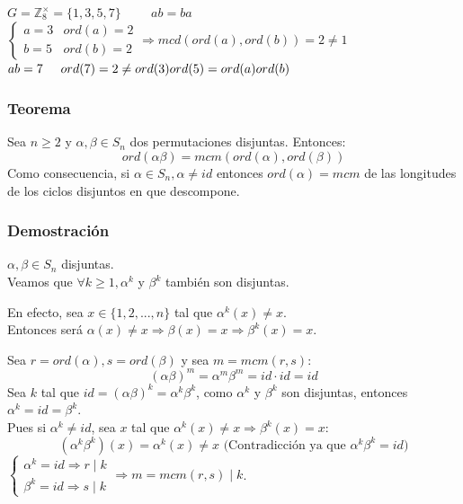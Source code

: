\documentclass[11pt,a4paper]{article}
\begin{document}
$G = \mathbb{Z}_{8}^{\times} = \{1,3,5,7\} \hspace{1cm} ab = ba$ \\
$\begin{cases}
a = 3 & ord(a) = 2 \\
b = 5 & ord(b) = 2
\end{cases}
\Rightarrow mcd(ord(a),ord(b)) = 2 \neq 1$ \\
$ab = 7 \hspace{0.5cm} ord(7) = 2 \neq ord(3)ord(5) = ord(a)ord(b)$

\subsubsection*{Teorema}

Sea $n \geq 2$ y $\alpha, \beta \in S_{n}$ dos permutaciones disjuntas. Entonces:
$$ord(\alpha \beta) = mcm(ord(\alpha), ord(\beta))$$
Como consecuencia, si $\alpha \in S_{n}, \alpha \neq id$ entonces $ord(\alpha) = mcm$ de las longitudes de los ciclos disjuntos en que descompone.

\subsubsection*{Demostración}

$\alpha, \beta \in S_{n}$ disjuntas. \\
Veamos que $\forall k \geq 1, \alpha^{k}$ y $\beta^{k}$ también son disjuntas.

En efecto, sea $x \in \{1, 2, ..., n\}$ tal que $\alpha^{k}(x) \neq x$. \\
Entonces será $\alpha(x) \neq x \Rightarrow \beta(x) = x \Rightarrow \beta^{k}(x) = x$.

Sea $r = ord(\alpha), s = ord(\beta)$ y sea $m = mcm(r,s)$:
$$(\alpha \beta)^{m} = \alpha^{m}\beta^{m} = id \cdot id = id$$
Sea $k$ tal que $id = (\alpha \beta)^{k} = \alpha^{k} \beta^{k}$, como $\alpha^{k}$ y $\beta^{k}$ son disjuntas, entonces $\alpha^{k} = id = \beta^{k}$. \\
Pues si $\alpha^{k} \neq id$, sea $x$ tal que $\alpha^{k}(x) \neq x \Rightarrow \beta^{k}(x) = x$:
$$(\alpha^{k} \beta^{k})(x) = \alpha^{k}(x) \neq x \text{ (Contradicción ya que } \alpha^{k}\beta^{k}=id)$$
$\begin{cases}
\alpha^{k} = id \Rightarrow r \mid k \\
\beta^{k} = id \Rightarrow s \mid k
\end{cases}
\Rightarrow m = mcm(r,s) \mid k$.
\end{document}
